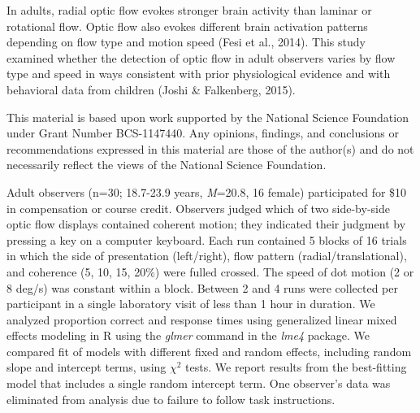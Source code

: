 \documentclass[landscape,final,a0paper,fontscale=0.285]{baposter}
\begin{document}
\begin{poster}
    {
      In adults, radial optic flow evokes stronger brain activity than laminar or rotational flow.
      Optic flow also evokes different brain activation patterns depending on flow type and motion speed (Fesi et al., 2014).
      This study examined whether the detection of optic flow in adult observers varies by flow type and speed in ways consistent with prior physiological evidence and with behavioral data from children (Joshi \& Falkenberg, 2015).
    }

    {
      This material is based upon work supported by the National Science Foundation under Grant Number BCS-1147440. Any opinions, findings, and conclusions or recommendations expressed in this material are those of the author(s) and do not necessarily reflect the views of the National Science Foundation.
    }

    {
      Adult observers (n=30; 18.7-23.9 years, \emph{M}=20.8, 16 female) participated for \$10 in compensation or course credit.
      Observers judged which of two side-by-side optic flow displays contained coherent motion; they indicated their judgment by pressing a key on a computer keyboard.
      Each run contained 5 blocks of 16 trials in which the side of presentation (left/right), flow pattern (radial/translational), and coherence (5, 10, 15, 20\%) were fulled crossed.
      The speed of dot motion (2 or 8 deg/s) was constant within a block.
      Between 2 and 4 runs were collected per participant in a single laboratory visit of less than 1 hour in duration.
      We analyzed proportion correct and response times using generalized linear mixed effects modeling in R using the \emph{glmer} command in the \emph{lme4} package.
      We compared fit of models with different fixed and random effects, including random slope and intercept terms, using \(\chi^{2}\) tests.
      We report results from the best-fitting model that includes a single random intercept term.
      One observer's data was eliminated from analysis due to failure to follow task instructions.
    }


\end{poster}
\end{document}
